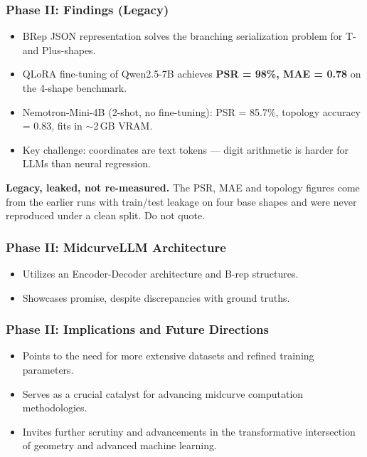 \begin{frame}[fragile]\frametitle{Phase II: Findings (Legacy)}
    \begin{itemize}
        \item BRep JSON representation solves the branching serialization problem for T- and Plus-shapes.
        \item QLoRA fine-tuning of Qwen2.5-7B achieves \textbf{PSR = 98\%, MAE = 0.78} on the 4-shape benchmark.
        \item Nemotron-Mini-4B (2-shot, no fine-tuning): PSR = 85.7\%, topology accuracy = 0.83, fits in $\sim$2\,GB VRAM.
        \item Key challenge: coordinates are text tokens --- digit arithmetic is harder for LLMs than neural regression.
    \end{itemize}

    \vspace{2pt}
    {\footnotesize \textbf{Legacy, leaked, not re-measured.} The PSR, MAE and topology figures come from the earlier runs with train/test leakage on four base shapes and were never reproduced under a clean split. Do not quote.}
\end{frame}

\begin{frame}[fragile]\frametitle{Phase II: MidcurveLLM Architecture}
    \begin{itemize}
        \item Utilizes an Encoder-Decoder architecture and B-rep structures.
        \item Showcases promise, despite discrepancies with ground truths.
    \end{itemize}
\end{frame}

\begin{frame}[fragile]\frametitle{Phase II: Implications and Future Directions}
    \begin{itemize}
        \item Points to the need for more extensive datasets and refined training parameters.
        \item Serves as a crucial catalyst for advancing midcurve computation methodologies.
        \item Invites further scrutiny and advancements in the transformative intersection of geometry and advanced machine learning.
    \end{itemize}
\end{frame}

